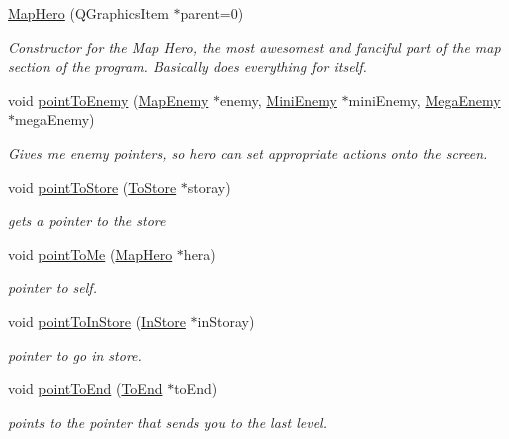 \begin{DoxyCompactItemize}
\item 
\hyperlink{class_map_hero_aa5dd4f5162b14b9c4dca9fe6b53482bd}{Map\-Hero} (Q\-Graphics\-Item $\ast$parent=0)
\begin{DoxyCompactList}\small\item\em Constructor for the Map Hero, the most awesomest and fanciful part of the map section of the program. Basically does everything for itself. \end{DoxyCompactList}\item 
void \hyperlink{class_map_hero_adb1c259574dc015f4f12055cced7508e}{point\-To\-Enemy} (\hyperlink{class_map_enemy}{Map\-Enemy} $\ast$enemy, \hyperlink{class_mini_enemy}{Mini\-Enemy} $\ast$mini\-Enemy, \hyperlink{class_mega_enemy}{Mega\-Enemy} $\ast$mega\-Enemy)
\begin{DoxyCompactList}\small\item\em Gives me enemy pointers, so hero can set appropriate actions onto the screen. \end{DoxyCompactList}\item 
void \hyperlink{class_map_hero_aa391ed82ab55cef8a3ec726cf89cac68}{point\-To\-Store} (\hyperlink{class_to_store}{To\-Store} $\ast$storay)
\begin{DoxyCompactList}\small\item\em gets a pointer to the store \end{DoxyCompactList}\item 
void \hyperlink{class_map_hero_a7d9e977eff02971c7899d1de134b598e}{point\-To\-Me} (\hyperlink{class_map_hero}{Map\-Hero} $\ast$hera)
\begin{DoxyCompactList}\small\item\em pointer to self. \end{DoxyCompactList}\item 
void \hyperlink{class_map_hero_aa931db713b67c5e65989a667ab6048dc}{point\-To\-In\-Store} (\hyperlink{class_in_store}{In\-Store} $\ast$in\-Storay)
\begin{DoxyCompactList}\small\item\em pointer to go in store. \end{DoxyCompactList}\item 
void \hyperlink{class_map_hero_aa6fa52a5f93d4d38fb6a331b0b74cb5d}{point\-To\-End} (\hyperlink{class_to_end}{To\-End} $\ast$to\-End)
\begin{DoxyCompactList}\small\item\em points to the pointer that sends you to the last level. \end{DoxyCompactList}\item 

\end{DoxyCompactItemize}
